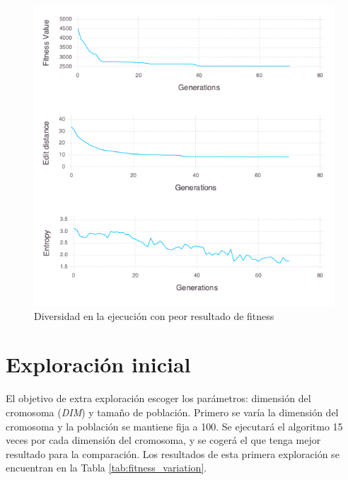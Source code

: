 \begin{figure}[]
	\centering	
	\includegraphics[scale=0.5]{figuras/config_file_1_Rastrigin_worst_f_value.png}
	\caption{ Diversidad en la ejecución con peor resultado de fitness }
    \label{fig:worst_f_value}
\end{figure}

\section{Exploración inicial}

El objetivo de extra exploración escoger los parámetros: dimensión del cromosoma (\textit{DIM}) y tamaño de población. Primero se varía la dimensión
del cromosoma y la población se mantiene fija a 100. Se ejecutará el algoritmo 15 veces por cada dimensión del cromosoma, y se cogerá el que 
tenga mejor resultado para la comparación. Los resultados de esta primera exploración se encuentran en la Tabla \ref{tab:fitness_variation}. 


